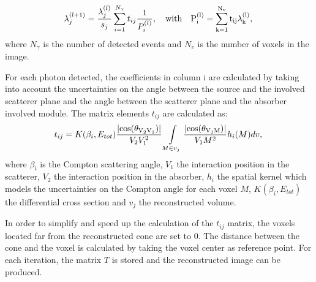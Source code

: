 \begin{equation}
\lambda_j^{(l+1)} =  \frac{\lambda_j^{(l)} }{s_j} \sum\limits_{i=1}^{N_{\gamma}} t_{ij} \frac{1}{P_i^{(l)}},\quad \rm{with}\quad  P_i^{(l)}=\sum\limits_{k=1}^{N_{v}} t_{ij}\lambda_k^{(l)},
 \label{eq:equation_lambda_compton_med_nucleaire}\newline
\end{equation}
where $N_{\gamma}$ is the number of detected events and $N_v$ is the number of voxels in the image.\newline

For each photon detected, the coefficients in column i are calculated by taking into account the uncertainties on the angle between the source and the involved scatterer plane and the angle between the scatterer plane and the absorber involved module.
The matrix elements $t_{ij}$ are calculated as:
\begin{equation}
 t_{ij} = K(\beta_i,E_{tot})\frac{|\rm{cos}(\theta_{{V_2V_1}}) |}{V_2V_1^2} \int\limits_{M\in v_j} \frac{|\rm{cos}(\theta_{V_1M})|}{V_1M^2} h_i(M)dv,
 \label{eq:equation_tij_compton_med_nucleaire}\newline
\end{equation}
where $\beta_i$ is the Compton scattering angle, $V_1$ the interaction position in the scatterer, $V_2$ the interaction position in the absorber, $h_i$ the spatial kernel which models the uncertainties on the Compton angle for each voxel $M$, $K(\beta_i,E_{tot})$ the differential cross section and $v_j$ the reconstructed volume.\newline

In order to simplify and speed up the calculation of the $t_{ij}$ matrix, the voxels located far from the reconstructed cone are set to 0. The distance between the cone and the voxel is calculated by taking the voxel center as reference point. \newline%
For each iteration, the matrix $T$ is stored and the reconstructed image can be produced.


